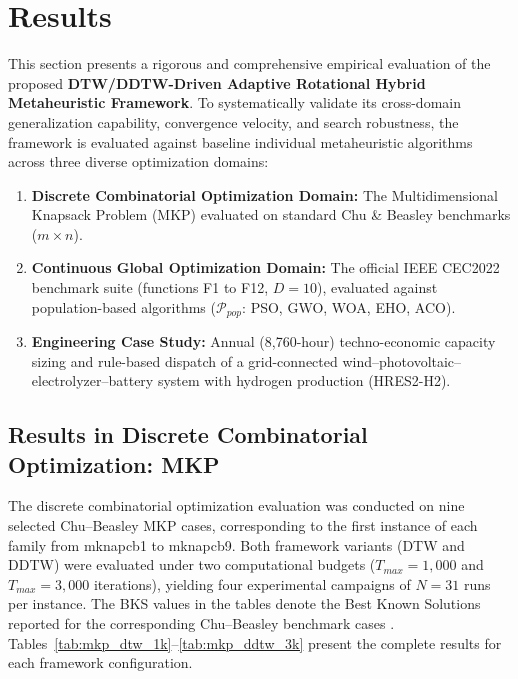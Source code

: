\section{Results}
\label{sec:results_and_discussion}


This section presents a rigorous and comprehensive empirical evaluation of the proposed \textbf{DTW/DDTW-Driven Adaptive Rotational Hybrid Metaheuristic Framework}. To systematically validate its cross-domain generalization capability, convergence velocity, and search robustness, the framework is evaluated against baseline individual metaheuristic algorithms across three diverse optimization domains:
\begin{enumerate}
    \item \textbf{Discrete Combinatorial Optimization Domain:} The Multidimensional Knapsack Problem (MKP) evaluated on standard Chu \& Beasley benchmarks ($m \times n$).
    \item \textbf{Continuous Global Optimization Domain:} The official IEEE CEC2022 benchmark suite (functions F1 to F12, $D=10$), evaluated against population-based algorithms ($\mathcal{P}_{pop}$: PSO, GWO, WOA, EHO, ACO).
    \item \textbf{Engineering Case Study:} Annual (8,760-hour) techno-economic capacity sizing and rule-based dispatch of a grid-connected wind--photovoltaic--electrolyzer--battery system with hydrogen production (HRES2-H2).
\end{enumerate}


\subsection{Results in Discrete Combinatorial Optimization: MKP}
\label{sec:results_mkp}

The discrete combinatorial optimization evaluation was conducted on nine
selected Chu--Beasley MKP cases, corresponding to the first instance of each
family from mknapcb1 to mknapcb9. Both framework variants (DTW and DDTW) were
evaluated under two computational budgets ($T_{max} = 1{,}000$ and
$T_{max} = 3{,}000$ iterations), yielding four experimental campaigns of
$N = 31$ runs per instance. The BKS values in the tables denote the Best Known
Solutions reported for the corresponding Chu--Beasley benchmark cases
\cite{chu1998genetic}. Tables~\ref{tab:mkp_dtw_1k}--\ref{tab:mkp_ddtw_3k}
present the complete results for each framework configuration.


